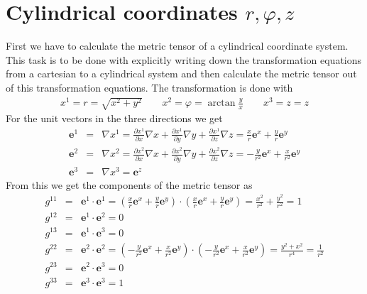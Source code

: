 \documentclass[12pt]{report}
\begin{document}
\section{Cylindrical coordinates $r,\varphi,z$}
First we have to calculate the metric tensor of a cylindrical coordinate
system. This task is to be done with explicitly writing down the
transformation equations from a cartesian to a cylindrical system and then
calculate the metric tensor out of this transformation equations.
The transformation is done with
\begin{eqnarray*}
  x^1=r=\sqrt{x^2+y^2}\qquad x^2=\varphi=\arctan\frac{y}{x}\qquad x^3=z=z
\end{eqnarray*}
For the unit vectors in the three directions we get
\begin{eqnarray*}
  \mathbf{e}^1&=&\nabla x^1
  =\frac{\partial x^1}{\partial x}\nabla x
  +\frac{\partial x^1}{\partial y}\nabla y
  +\frac{\partial x^1}{\partial z}\nabla z
  =\frac{x}{r}\mathbf{e}^x+\frac{y}{r}\mathbf{e}^y\\
  \mathbf{e}^2&=&\nabla x^2
  =\frac{\partial x^2}{\partial x}\nabla x
  +\frac{\partial x^2}{\partial y}\nabla y
  +\frac{\partial x^2}{\partial z}\nabla z
  =-\frac{y}{r^2}\mathbf{e}^x+\frac{x}{r^2}\mathbf{e}^y\\
  \mathbf{e}^3&=&\nabla x^3=\mathbf{e}^z
\end{eqnarray*}
From this we get the components of the metric tensor as
\begin{eqnarray*}
  g^{11} &=& \mathbf{e}^1\cdot\mathbf{e}^1
  =\left(\frac{x}{r}\mathbf{e}^x+\frac{y}{r}\mathbf{e}^y\right)
  \cdot\left(\frac{x}{r}\mathbf{e}^x+\frac{y}{r}\mathbf{e}^y\right)
  =\frac{x^2}{r^2}+\frac{y^2}{r^2}=1\\
  g^{12} &=& \mathbf{e}^1\cdot\mathbf{e}^2=0\\
  g^{13} &=& \mathbf{e}^1\cdot\mathbf{e}^3=0\\
  g^{22} &=& \mathbf{e}^2\cdot\mathbf{e}^2
  =\left(-\frac{y}{r^2}\mathbf{e}^x+\frac{x}{r^2}\mathbf{e}^y\right)\cdot
  \left(-\frac{y}{r^2}\mathbf{e}^x+\frac{x}{r^2}\mathbf{e}^y\right)
  =\frac{y^2+x^2}{r^4}=\frac{1}{r^2}\\
  g^{23} &=& \mathbf{e}^2\cdot\mathbf{e}^3=0\\
  g^{33} &=& \mathbf{e}^3\cdot\mathbf{e}^3=1
\end{eqnarray*}
\end{document}
